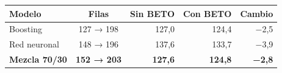 \begin{tabular}{lcrrr}
\toprule
Modelo & Filas & Sin BETO & Con BETO & Cambio \\
\midrule
Boosting & 127 → 198 & 127,0 & 124,4 & −2,5 \\
Red neuronal & 148 → 196 & 137,6 & 133,7 & −3,9 \\
\textbf{Mezcla 70/30} & \textbf{152 → 203} & \textbf{127,6} & \textbf{124,8} & \textbf{−2,8} \\
\bottomrule
\end{tabular}
